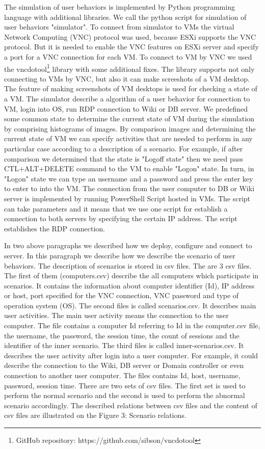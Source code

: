 The simulation of user behaviors is implemented by Python programming language with additional libraries. We call the python script for simulation of user behaviors "simulator". To connect from simulator to VMs the virtual Network Computing (VNC) protocol was used, because ESXi supports the VNC protocol. But it is needed to enable the VNC features on ESXi server and specify a port for a VNC connection for each VM. To connect to VM by VNC we used the vncdotool\footnote{GitHub repository: https://github.com/sibson/vncdotool} library with some additional fixes. The library supports not only connecting to VMs by VNC, but also it can make screeshots of a VM desktop. The feature of making screenshots of VM desktops is used for checking a state of a VM. The simulator describe a algorithm of a user behavior for connection to VM, login into OS, run RDP connection to Wiki or DB server. We predefined some common state to determine the current state of VM during the simulation by comprising histograms of images. By comparison images and determining the current state of VM we can specify activities that are needed to perform in any particular case according to a description of a scenario. For example, if after comparison we determined that the state is "Logoff state" then we need pass CTL+ALT+DELETE command to the VM to enable "Logon" state. In turn, in "Logon" state we can type an username and a password and press the enter key to enter to into the VM. The connection from the user computer to DB or Wiki server is implemented by running PowerShell Script hosted in VMs. The script can take parameters and it means that we use one script for establish a connection to both servers by specifying the certain IP address. The script establishes the RDP connection. 

In two above paragraphs we described how we deploy, configure and connect to server. In this paragraph we describe how we describe the scenario of user behaviors. The description of scenarios is stored in csv files. The are 3 csv files. The first of them (computers.csv) describe the all computers which participate in scenarios. It contains the information about computer identifier (Id), IP address or host, port specified for the VNC connection, VNC password and type of operation system (OS).
The second files is called scenarios.csv. It describes main user activities. The main user activity means the connection to the user computer. The file contains a computer Id referring to Id in the computer.csv file, the username, the password, the session time, the count of sessions and the identifier of the inner scenario. The third files is called inner-scenarios.csv. It describes the user activity after login into a user computer. For example, it could describe the connection to the Wiki, DB server or Domain controller or even connection to another user computer. The files contains Id, host, username, password, session time. There are two sets of csv files. The first set is used to perform the normal scenario and the second is used to perform the abnormal scenario accordingly. The described relations between csv files and the content of csv files are illustrated on the Figure 3: Scenario relations.
 	
